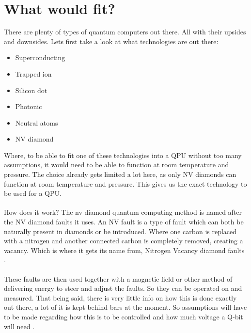 \section{What would fit?}
\label{sec:task}
There are plenty of types of quantum computers out there. All with their upsides and downsides. Lets first take a look at what technologies are out there:

\begin{itemize}
  \item Superconducting
  \item Trapped ion
  \item Silicon dot
  \item Photonic
  \item Neutral atoms
  \item NV diamond
\end{itemize}

Where, to be able to fit one of these technologies into a QPU without too many assumptions, it would need to be able to function at room temperature and pressure. The choice already gets limited a lot here, as only NV diamonds can function at room temperature and pressure. This gives us the exact technology to be used for a QPU. 
\\\\
How does it work? The nv diamond quantum computing method is named after the NV diamond faults it uses. An NV fault is a type of fault which can both be naturally present in diamonds or be introduced. Where one carbon is replaced with a nitrogen and another connected carbon is completely removed, creating a vacancy. Which is where it gets its name from, Nitrogen Vacancy diamond faults \cite{wikipedia1}.
\\\\
These faults are then used together with a magnetic field or other method of delivering energy to steer and adjust the faults. So they can be operated on and measured. That being said, there is very little info on how this is done exactly out there, a lot of it is kept behind bars at the moment. So assumptions will have to be made regarding how this is to be controlled and how much voltage a Q-bit will need \cite{article1}.